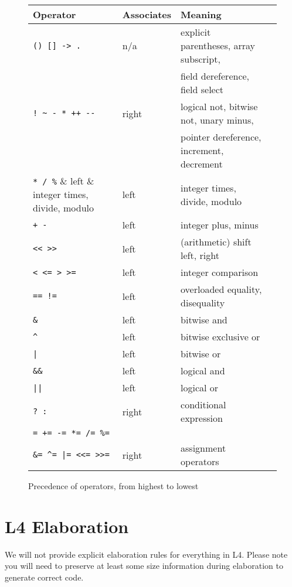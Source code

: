\documentclass[11pt]{article}
\begin{document}
\begin{figure}
\renewcommand{\arraystretch}{1.4}
\begin{tabular}{llll}
\hline
Operator & Associates & Meaning \\
\hline
\verb"() [] -> ."       & n/a   & explicit parentheses, array subscript, \\
                        &       & field dereference, field select \\
\verb"! ~ - * ++ --"      & right & logical not, bitwise not, unary minus, \\
					& & pointer dereference, increment, decrement \\
\verb"* / %"            & left  & integer times, divide, modulo \\
\verb"+ -"              & left  & integer plus, minus \\
\verb"<< >>"            & left  & (arithmetic) shift left, right\\
\verb"< <= > >="        & left  & integer comparison \\
\verb"== !="            & left  & overloaded equality, disequality \\
\verb"&"                & left  & bitwise and \\
\verb"^"                & left  & bitwise exclusive or \\
\verb"|"                & left  & bitwise or \\
\verb"&&"               & left  & logical and \\
\verb"||"               & left  & logical or \\
\verb"? :"              & right & conditional expression \\
\verb"= += -= *= /= %=" \\
\hspace{3em}\verb"&= ^= |= <<= >>=" & right & assignment operators \\
\hline
\end{tabular}
\caption{Precedence of operators, from highest to lowest}
\label{fig:precedence}
\end{figure}


\section{L4 Elaboration}
\label{sec:elab}

We will not provide explicit elaboration rules for everything in
L4. Please note you will need to preserve at least some size
information during elaboration to generate correct code.
\end{document}
